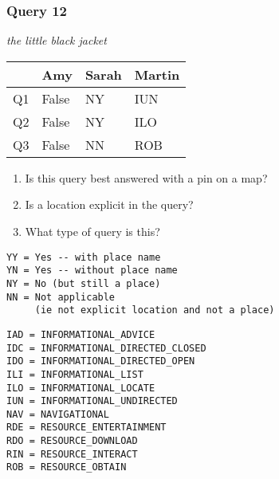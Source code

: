 \begin{frame}[fragile]
\frametitle{Query 12}
\vspace{1em}

\emph{the little black jacket}

\vfill

\begin{table}
  \centering
  \begin{tabular}{ l l l l }
    & \textbf{Amy} & \textbf{Sarah} & \textbf{Martin}\\
    \toprule
    Q1 & False & NY & IUN\\
Q2 & False & NY & ILO\\
Q3 & False & NN & ROB\\
    \bottomrule
  \end{tabular}
\end{table}

\vfill

\tiny{

\begin{enumerate}
\item Is this query best answered with a pin on a map?
\item Is a location explicit in the query?
\item What type of query is this?
\end{enumerate}

\vfill

\begin{multicols}{2}
\begin{verbatim}
YY = Yes -- with place name
YN = Yes -- without place name
NY = No (but still a place)
NN = Not applicable 
     (ie not explicit location and not a place)
\end{verbatim}

\columnbreak
\begin{verbatim}
IAD = INFORMATIONAL_ADVICE
IDC = INFORMATIONAL_DIRECTED_CLOSED
IDO = INFORMATIONAL_DIRECTED_OPEN
ILI = INFORMATIONAL_LIST
ILO = INFORMATIONAL_LOCATE
IUN = INFORMATIONAL_UNDIRECTED
NAV = NAVIGATIONAL
RDE = RESOURCE_ENTERTAINMENT
RDO = RESOURCE_DOWNLOAD
RIN = RESOURCE_INTERACT
ROB = RESOURCE_OBTAIN
\end{verbatim}
\end{multicols}
}

\end{frame}


